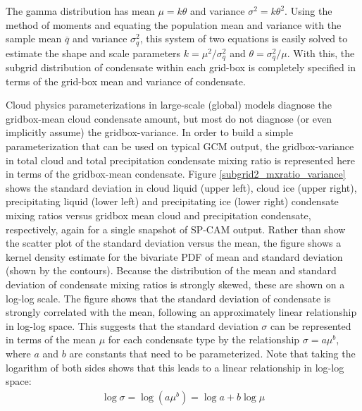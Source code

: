 The gamma distribution has mean $\mu = k\theta$ and variance $\sigma^2 = k \theta^2$. Using the method of moments \citep[e.g.,][]{wilks_2011} and equating the population mean and variance with the sample mean $\overline{q}$ and variance $\sigma_q^2$, this system of two equations is easily solved to estimate the shape and scale parameters $k = \mu^2 / \sigma_q^2$ and $\theta = \sigma_q^2 / \mu$. With this, the subgrid distribution of condensate within each grid-box is completely specified in terms of the grid-box mean and variance of condensate.

Cloud physics parameterizations in large-scale (global) models diagnose the gridbox-mean cloud condensate amount, but most do not diagnose (or even implicitly assume) the gridbox-variance. In order to build a simple parameterization that can be used on typical GCM output, the gridbox-variance in total cloud and total precipitation condensate mixing ratio is represented here in terms of the gridbox-mean condensate. Figure \ref{subgrid2_mxratio_variance} shows the standard deviation in cloud liquid (upper left), cloud ice (upper right), precipitating liquid (lower left) and precipitating ice (lower right) condensate mixing ratios versus gridbox mean cloud and precipitation condensate, respectively, again for a single snapshot of SP-CAM output. Rather than show the scatter plot of the standard deviation versus the mean, the figure shows a kernel density estimate for the bivariate PDF of mean and standard deviation (shown by the contours). Because the distribution of the mean and standard deviation of condensate mixing ratios is strongly skewed, these are shown on a log-log scale. The figure shows that the standard deviation of condensate is strongly correlated with the mean, following an approximately linear relationship in log-log space. This suggests that the standard deviation $\sigma$ can be represented in terms of the mean $\mu$ for each condensate type by the relationship $\sigma = a \mu^b$, where $a$ and $b$ are constants that need to be parameterized. Note that taking the logarithm of both sides shows that this leads to a linear relationship in log-log space:
\begin{gather}
    \log \sigma = \log(a \mu^b) = \log a + b\log \mu
\end{gather}
